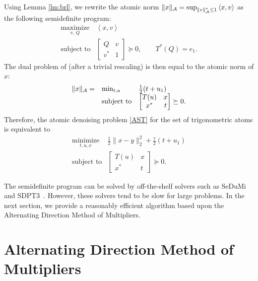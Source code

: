 Using Lemma \ref{lm:brl}, we rewrite the atomic norm $\|x\|_{\mathcal{A}} =
\sup_{\|v\|_{\mathcal{A}}^*\leq 1} \left<x, v\right> $ as the following semidefinite
program:
\begin{equation}\label{eq:sdpprimal}
 \begin{array}{ll}
\operatorname*{maximize}_{v,\ Q} & \left<x, v\right>\\
\text{subject  to}  &
 \begin{bmatrix}
  Q & v \\
  v^* & 1
 \end{bmatrix} \succeq 0, \qquad  T^*(Q) = {e}_1 .
\end{array}
\end{equation}
The dual problem of  (after a trivial rescaling) is then equal to
the atomic norm of $x$:
\begin{align*}
\begin{array}{lll} \|x\|_{\mathcal{A}} =&  \min_{t, u} & \tfrac{1}{2} (t + u_1)  \\
&\operatorname{subject\ to}
& \begin{bmatrix}
  T(u) & x \\
  x^* & t
 \end{bmatrix} \succeq 0.\end{array}
\end{align*}
Therefore, the atomic denoising problem \eqref{AST} for the set of trigonometric atoms is equivalent to
\begin{equation}\label{eq:sdpdenoising}
\begin{array}{ll}
\operatorname*{minimize}_{t, u, x} & \frac{1}{2} \|x - y\|_2^2 + \frac{\tau}{2}(t + u_1) \\
\operatorname{subject\ to}
& \begin{bmatrix}
  T(u) &  x \\
 x^* & t
 \end{bmatrix} \succeq 0.\end{array} 
\end{equation}

The semidefinite program  can be solved by off-the-shelf
solvers such as SeDuMi~\cite{sedumi} and SDPT3~\cite{SDPT3}. However, these
solvers tend to be slow for large problems. In the next section, we provide a
reasonably efficient algorithm based upon the Alternating Direction Method of
Multipliers.


\section{Alternating Direction Method of Multipliers}
\label{sec:admm}

